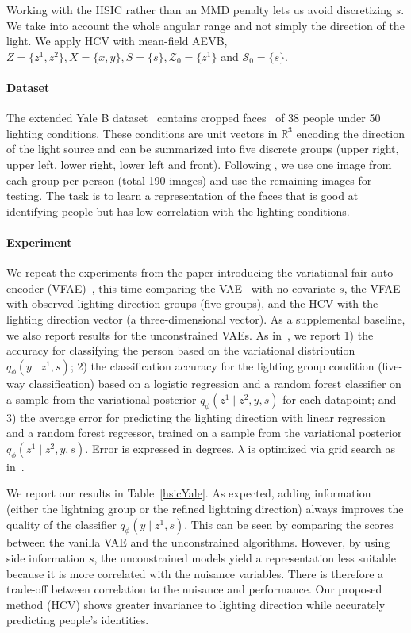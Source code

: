 Working with the HSIC rather than an MMD penalty lets us avoid discretizing $s$. We take into account the whole angular range and not simply the direction of the light. We apply HCV with mean-field AEVB, $Z = \{z^1, z^2\}, X = \{x, y\}, S = \{s\}, \mathcal{Z}_0 = \{z^1\}$ and $\mathcal{S}_0 = \{s\}$.


\paragraph{Dataset}
The extended Yale B dataset~\cite{YALEB} contains cropped faces~\cite{KCLee05} of 38 people under 50 lighting conditions. These conditions are unit vectors in $\mathbb{R}^3$ encoding the direction of the light source and can be summarized into five discrete groups (upper right, upper left, lower right, lower left and front). Following \cite{VFAE}, we use one image from each group per person (total 190 images) and use the remaining images for testing. The task is to learn a representation of the faces that is good at identifying people but has low correlation with the lighting conditions.

\paragraph{Experiment}
We repeat the experiments from the paper introducing the variational fair auto-encoder (VFAE)~\cite{VFAE}, this time comparing the VAE~\cite{AEVB} with no covariate $s$, the VFAE~\cite{VFAE} with observed lighting direction groups (five groups), and the HCV with the lighting direction vector (a three-dimensional vector). As a supplemental baseline, we also report results for the unconstrained VAEs. As in~\cite{VFAE}, we report 1) the accuracy for classifying the person based on the variational distribution $q_\phi(y \mid z^1, s)$; 2) the classification accuracy for the lighting group condition (five-way classification) based on a logistic regression and a random forest classifier on a sample from the variational posterior $q_\phi(z^1 \mid z^2, y, s)$ for each datapoint; and 3) the average error for predicting the lighting direction with linear regression and a random forest regressor, trained on a sample from the variational posterior $q_\phi(z^1 \mid z^2, y, s)$. Error is expressed in degrees. $\lambda$ is optimized via grid search as in~\cite{VFAE}. 

We report our results in Table~\ref{hsicYale}. As expected, adding information (either the lightning group or the refined lightning direction) always improves the quality of the classifier $q_\phi(y \mid z^1, s)$. This can be seen by comparing the scores between the vanilla VAE and the unconstrained algorithms. However, by using side information $s$, the unconstrained models yield a representation less suitable because it is more correlated with the nuisance variables. There is therefore a trade-off between correlation to the nuisance and performance. Our proposed method (HCV) shows greater invariance to lighting direction while accurately predicting people's identities.


